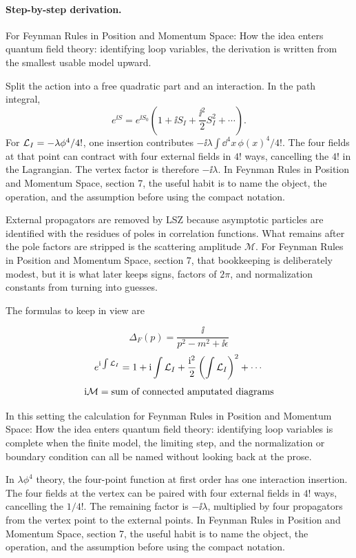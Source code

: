 \paragraph{Step-by-step derivation.}

For Feynman Rules in Position and Momentum Space: How the idea enters quantum field theory: identifying loop variables, the derivation is written from the smallest usable model upward.

Split the action into a free quadratic part and an interaction.  In the path integral,
\[
  e^{\ii S}=e^{\ii S_0}\left(1+\ii S_I+\frac{\ii^2}{2}S_I^2+\cdots\right).
\]
For \(\mathcal L_I=-\lambda\phi^4/4!\), one insertion contributes \(-\ii\lambda\int\dd^4x\,\phi(x)^4/4!\).  The four fields at that point can contract with four external fields in \(4!\) ways, cancelling the \(4!\) in the Lagrangian.  The vertex factor is therefore \(-\ii\lambda\).  In Feynman Rules in Position and Momentum Space, section 7, the useful habit is to name the object, the operation, and the assumption before using the compact notation.

External propagators are removed by LSZ because asymptotic particles are identified with the residues of poles in correlation functions.  What remains after the pole factors are stripped is the scattering amplitude \(\mathcal M\).  For Feynman Rules in Position and Momentum Space, section 7, that bookkeeping is deliberately modest, but it is what later keeps signs, factors of \(2\pi\), and normalization constants from turning into guesses.

The formulas to keep in view are

\[
  \Delta_F(p)=\frac{\ii}{p^2-m^2+\ii\epsilon}
\]
\[
  e^{\mathrm i\int\mathcal L_I}=1+\mathrm i\int\mathcal L_I+\frac{\mathrm i^2}{2}\left(\int\mathcal L_I\right)^2+\cdots
\]
\[
  \mathrm i\mathcal M=\hbox{sum of connected amputated diagrams}
\]

In this setting the calculation for Feynman Rules in Position and Momentum Space: How the idea enters quantum field theory: identifying loop variables is complete when the finite model, the limiting step, and the normalization or boundary condition can all be named without looking back at the prose.




\begin{example}
In \(\lambda\phi^4\) theory, the four-point function at first order has one interaction insertion.  The four fields at the vertex can be paired with four external fields in \(4!\) ways, cancelling the \(1/4!\).  The remaining factor is \(-\ii\lambda\), multiplied by four propagators from the vertex point to the external points.  In Feynman Rules in Position and Momentum Space, section 7, the useful habit is to name the object, the operation, and the assumption before using the compact notation.
\end{example}



